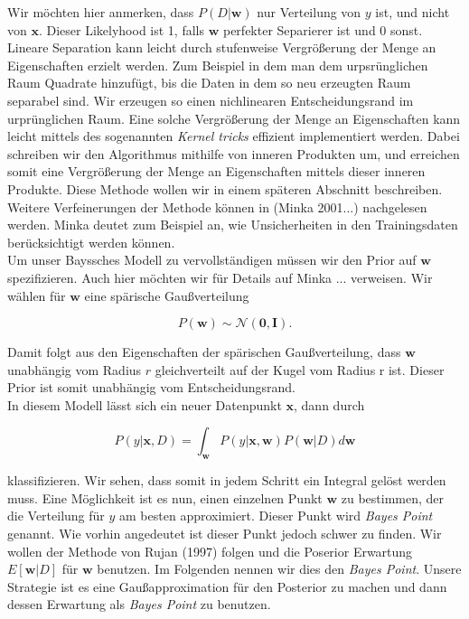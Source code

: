 \documentclass[12pt,a4paper]{scrartcl}
\numberwithin{equation}{section}
\begin{document}
{ Wir möchten hier anmerken, dass $P(D|\mathbf{w})$ nur Verteilung von $y$ ist, und nicht von $\mathbf{x}$.
 Dieser Likelyhood ist 1, falls $\mathbf{w}$ perfekter Separierer ist und 0 sonst. Lineare Separation kann
 leicht durch stufenweise Vergrößerung der Menge an Eigenschaften erzielt werden. 
 Zum Beispiel in dem man dem urpsrünglichen Raum Quadrate hinzufügt, bis die Daten in dem so neu erzeugten Raum
 separabel sind. Wir erzeugen so einen nichlinearen Entscheidungsrand im urprünglichen Raum. 
 Eine solche Vergrößerung der Menge an Eigenschaften kann leicht mittels des sogenannten \textit{Kernel tricks} 
 effizient implementiert werden. Dabei schreiben wir den Algorithmus mithilfe von inneren Produkten um, und 
 erreichen somit eine Vergrößerung der Menge an Eigenschaften mittels dieser inneren Produkte. 
 Diese Methode wollen wir in einem späteren Abschnitt beschreiben. 
 Weitere Verfeinerungen der Methode können in (Minka 2001...) nachgelesen werden. Minka deutet zum Beispiel an, wie Unsicherheiten
 in den Trainingsdaten berücksichtigt werden können. \\
 
 Um unser Bayssches Modell zu vervollständigen müssen wir den Prior auf $\mathbf{w}$ spezifizieren. 
 Auch hier möchten wir für Details auf Minka ... verweisen. 
 Wir wählen für $\mathbf{w}$ eine spärische Gaußverteilung
 
 \begin{equation}
  P(\mathbf{w}) \sim \mathcal{N}(\mathbf{0,I}).
 \end{equation}

 Damit folgt aus den Eigenschaften der spärischen Gaußverteilung, dass $\mathbf{w}$ unabhängig vom Radius $r$
 gleichverteilt auf der Kugel vom Radius r ist. Dieser Prior ist somit unabhängig vom Entscheidungsrand.
 \\
 In diesem Modell lässt sich ein neuer Datenpunkt $\mathbf{x}$, dann durch 
 
 \begin{equation}
  P(y|\mathbf{x},D) = \int_{\mathbf{w}} P(y|\mathbf{x,w}) P(\mathbf{w}|D) d \mathbf{w}
 \end{equation}
 
 klassifizieren. Wir sehen, dass somit in jedem Schritt ein Integral gelöst werden muss. 
 Eine Möglichkeit ist es nun, einen einzelnen Punkt $\mathbf{w}$ zu bestimmen, der die Verteilung für $y$
 am besten approximiert. Dieser Punkt wird \textit{Bayes Point} genannt. 
 Wie vorhin angedeutet ist dieser Punkt jedoch schwer zu finden. Wir wollen der Methode von Rujan (1997)
 folgen und die Poserior Erwartung $E[\mathbf{w}|D]$ für $\mathbf{w}$ benutzen. Im Folgenden nennen wir 
 dies den \textit{Bayes Point}. Unsere Strategie ist es eine Gaußapproximation für den Posterior zu machen und dann
 dessen Erwartung als \textit{Bayes Point} zu benutzen. 
 
}
\end{document}
